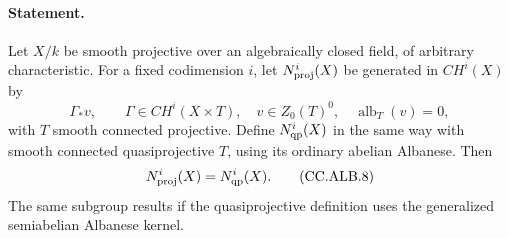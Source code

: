 \paragraph{Statement.}
Let $X/k$ be smooth projective over an algebraically
closed field, of arbitrary characteristic.
For a fixed codimension $i$, let
$N^i_{\rm proj}(X)$ be generated in $CH^i(X)$ by
\[
 \Gamma_*v,\qquad
 \Gamma\in CH^i(X\times T),\quad
 v\in Z_0(T)^0,\quad \operatorname{alb}_T(v)=0,
                                                               \tag{CC.ALB.7}
\]
with $T$ smooth connected projective.
Define $N^i_{\rm qp}(X)$ in the same way with smooth
connected quasiprojective $T$, using its ordinary
abelian Albanese.  Then
\[
 N^i_{\rm proj}(X)=N^i_{\rm qp}(X).                 \tag{CC.ALB.8}
\]
The same subgroup results if the quasiprojective
definition uses the generalized semiabelian
Albanese kernel.

